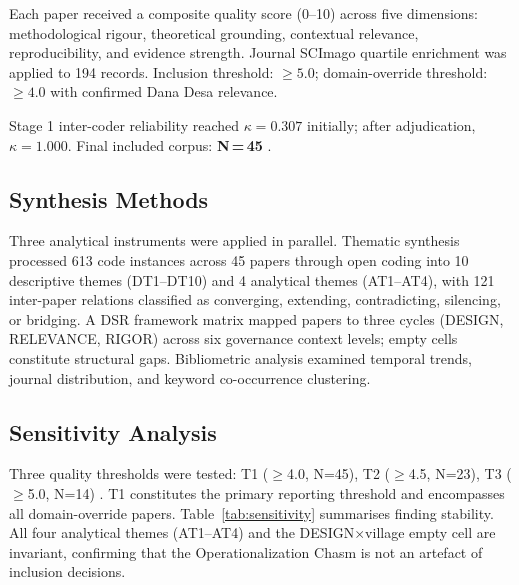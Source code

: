 \documentclass[3p,times,procedia]{elsarticle}
\begin{document}
Each paper received a composite quality score (0--10) across five dimensions: methodological rigour, theoretical grounding, contextual relevance, reproducibility, and evidence strength. Journal SCImago quartile enrichment was applied to 194 records. Inclusion threshold: $\geq 5.0$; domain-override threshold: $\geq 4.0$ with confirmed Dana Desa relevance.

Stage 1 inter-coder reliability reached $\kappa = 0.307$ initially; after adjudication, $\kappa = 1.000$. Final included corpus: \textbf{N\,=\,45} \cite{p001,p002,p003,p004,p005,p006,p007,p008,p009,p010,p011,p012,p013,p014,p015,p016,p017,p018,p019,p020,p021,p022,p023,p024,p025,p026,p027,p028,p029,p030,p031,p032,p033,p034,p035,p036,p037,p038,p039,p040,p041,p042,p043,p044,p045}.

\subsection{Synthesis Methods}

Three analytical instruments were applied in parallel. Thematic synthesis \cite{method_thomas2008} processed 613 code instances across 45 papers through open coding into 10 descriptive themes (DT1--DT10) and 4 analytical themes (AT1--AT4), with 121 inter-paper relations classified as converging, extending, contradicting, silencing, or bridging. A DSR framework matrix \cite{method_hevner2004} mapped papers to three cycles (DESIGN, RELEVANCE, RIGOR) across six governance context levels; empty cells constitute structural gaps. Bibliometric analysis \cite{method_donthu2021} examined temporal trends, journal distribution, and keyword co-occurrence clustering.

\subsection{Sensitivity Analysis}

Three quality thresholds were tested: T1 ($\geq$4.0, N=45), T2 ($\geq$4.5, N=23), T3 ($\geq$5.0, N=14) \cite{method_higgins2011}. T1 constitutes the primary reporting threshold and encompasses all domain-override papers. Table~\ref{tab:sensitivity} summarises finding stability. All four analytical themes (AT1--AT4) and the DESIGN$\times$village empty cell are invariant, confirming that the Operationalization Chasm is not an artefact of inclusion decisions.
\end{document}

